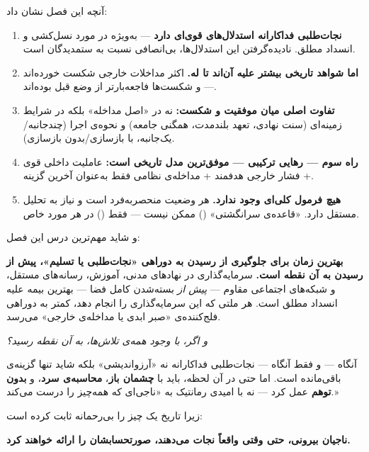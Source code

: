 \begin{tcolorbox}[quotebox, title={کلام پایانی فصل}]
آنچه این فصل نشان داد:

\begin{enumerate}
\item \textbf{نجات‌طلبی فداکارانه استدلال‌های قوی‌ای دارد} — به‌ویژه در مورد نسل‌کشی و انسداد مطلق. نادیده‌گرفتن این استدلال‌ها، بی‌انصافی نسبت به ستمدیدگان است.

\item \textbf{اما شواهد تاریخی بیشتر علیه آن‌اند تا له.} اکثر مداخلات خارجی شکست خورده‌اند — و شکست‌ها فاجعه‌بارتر از وضع قبل بوده‌اند.

\item \textbf{تفاوت اصلی میان موفقیت و شکست:} نه در «اصل مداخله» بلکه در شرایط زمینه‌ای (سنت نهادی، تعهد بلندمدت، همگنی جامعه) و نحوه‌ی اجرا (چندجانبه/یک‌جانبه، با بازسازی/بدون بازسازی).

\item \textbf{راه سوم — رهایی ترکیبی — موفق‌ترین مدل تاریخی است:} عاملیت داخلی قوی + فشار خارجی هدفمند + مداخله‌ی نظامی فقط به‌عنوان آخرین گزینه.

\item \textbf{هیچ فرمول کلی‌ای وجود ندارد.} هر وضعیت منحصربه‌فرد است و نیاز به تحلیل مستقل دارد. «قاعده‌ی سرانگشتی» () ممکن نیست — فقط  () در هر مورد خاص.
\end{enumerate}

و شاید مهم‌ترین درس این فصل:

\textbf{بهترین زمان برای جلوگیری از رسیدن به دوراهی «نجات‌طلبی یا تسلیم»، پیش از رسیدن به آن نقطه است.} سرمایه‌گذاری در نهادهای مدنی، آموزش، رسانه‌های مستقل، و شبکه‌های اجتماعی مقاوم — \textit{پیش از} بسته‌شدن کامل فضا — بهترین بیمه علیه انسداد مطلق است. هر ملتی که این سرمایه‌گذاری را انجام دهد، کمتر به دوراهی فلج‌کننده‌ی «صبر ابدی یا مداخله‌ی خارجی» می‌رسد.

\textit{و اگر، با وجود همه‌ی تلاش‌ها، به آن نقطه رسید؟}

آنگاه — و فقط آنگاه — نجات‌طلبی فداکارانه نه «آرزواندیشی» بلکه شاید تنها گزینه‌ی باقی‌مانده است. اما حتی در آن لحظه، باید با \textbf{چشمان باز}، \textbf{محاسبه‌ی سرد}، و \textbf{بدون توهم} عمل کرد — نه با امیدی رمانتیک به «ناجی‌ای که همه‌چیز را درست می‌کند.»

زیرا تاریخ یک چیز را بی‌رحمانه ثابت کرده است:

\textbf{ناجیان بیرونی، حتی وقتی واقعاً نجات می‌دهند، صورتحسابشان را ارائه خواهند کرد.}
\end{tcolorbox}

